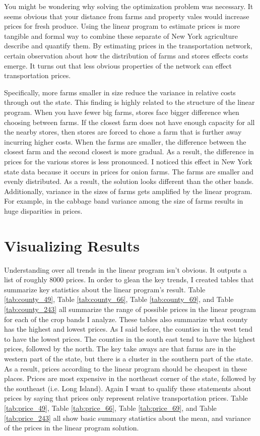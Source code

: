 \documentclass{report}
\begin{document}
You might be wondering why solving the optimization problem was necessary. It seems obvious that your distance from farms and property vales would increase prices for fresh produce. Using the linear program to estimate prices is more tangible and formal way to combine these separate of New York agriculture describe and quantify them. By estimating prices in the transportation network, certain observation about how the distribution of farms and stores effects costs emerge. It turns out that less obvious properties of the network can effect transportation prices. 

Specifically, more farms smaller in size reduce the variance in relative costs through out the state. This finding is highly related to the structure of the linear program. When you have fewer big farms, stores face bigger difference when choosing between farms. If the closest farm does not have enough capacity for all the nearby stores, then stores are forced to chose a farm that is further away incurring higher costs. When the farms are smaller, the difference between the closest farm and the second closest is more gradual. As a result, the difference in prices for the various stores is less pronounced. I noticed this effect in New York state data because it occurs in  prices for onion farms. The farms are smaller and evenly distributed. As a result, the solution looks different than the other bands. Additionally, variance in the sizes of farms gets amplified by the linear program. For example, in the cabbage band variance among the size of farms results in huge disparities in prices.

\section{Visualizing Results}

Understanding over all trends in the linear program isn't obvious. It outputs a list of roughly 8000 prices. In order to glean the key trends, I created tables that summarize key statistics about the linear program's result. Table \ref{tab:county_49}, Table \ref{tab:county_66}, Table \ref{tab:county_69}, and Table \ref{tab:county_243} all summarize the range of possible prices in the linear program for each of the crop bands I analyze. These tables also summarize what county has the highest and lowest prices. As I said before, the counties in the west tend to have the lowest prices. The counties in the south east tend to have the highest prices, followed by the north. The key take aways are that farms are in the western part of the state, but there is a cluster in the southern part of the state. As a result, prices according to the linear program should be cheapest in these places. Prices are most expensive in the northeast corner of the state, followed by the southeast (i.e. Long Island). Again I want to qualify these statements about prices by saying that prices only represent relative transportation prices. Table  \ref{tab:price_49}, Table  \ref{tab:price_66}, Table  \ref{tab:price_69}, and Table  \ref{tab:price_243} all show basic summary statistics about the mean, and variance of the prices in the linear program solution.
\end{document}
